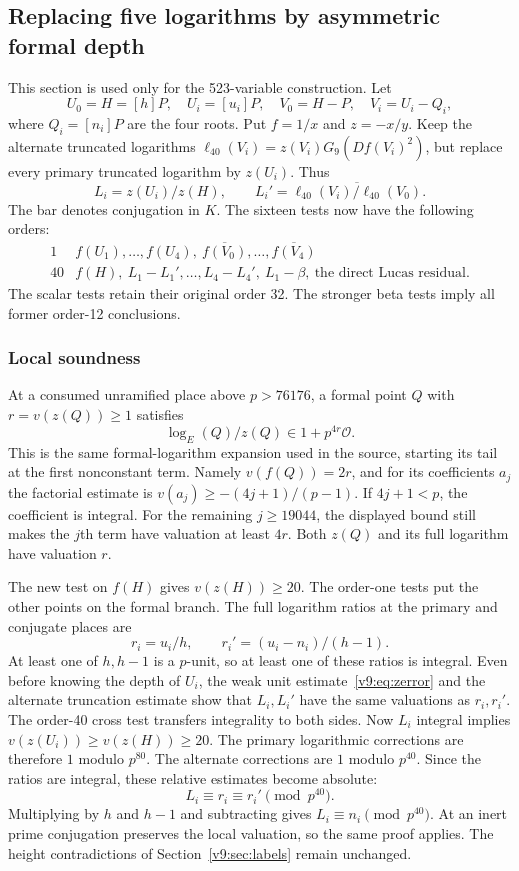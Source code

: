 \subsection{Replacing five logarithms by asymmetric formal depth}\label{v9:sec:depth}
This section is used only for the 523-variable construction. Let
\[
 U_0=H=[h]P,\quad U_i=[u_i]P,\quad
 V_0=H-P,\quad V_i=U_i-Q_i,
\]
where $Q_i=[n_i]P$ are the four roots. Put $f=1/x$ and $z=-x/y$. Keep the alternate truncated logarithms $\ell_{40}(V_i)=z(V_i)G_9(Df(V_i)^2)$, but replace every primary truncated logarithm by $z(U_i)$. Thus
\[
 L_i=z(U_i)/z(H),\qquad
 L_i'=\overline{\ell_{40}(V_i)/\ell_{40}(V_0)}.
\]
The bar denotes conjugation in $K$. The sixteen tests now have the following orders:
\[
\begin{array}{c|l}
1 & f(U_1),\ldots,f(U_4),\ \overline{f(V_0)},\ldots,\overline{f(V_4)}\\[2pt]
40 & f(H),\ L_1-L_1',\ldots,L_4-L_4',\ L_1-\beta,\
       \text{the direct Lucas residual}.
\end{array}
\]
The scalar tests retain their original order 32. The stronger beta tests imply all former order-12 conclusions.

\subsubsection{Local soundness}\label{subsec:v9-local-depth}
At a consumed unramified place above $p>76176$, a formal point $Q$ with $r=v(z(Q))\ge1$ satisfies
\begin{equation}\label{v9:eq:zerror}
 \log_E(Q)/z(Q)\in1+p^{4r}\mathcal O.
\end{equation}
This is the same formal-logarithm expansion used in the source, starting its tail at the first nonconstant term. Namely $v(f(Q))=2r$, and for its coefficients $a_j$ the factorial estimate is $v(a_j)\ge-(4j+1)/(p-1)$. If $4j+1<p$, the coefficient is integral. For the remaining $j\ge19044$, the displayed bound still makes the $j$th term have valuation at least $4r$. Both $z(Q)$ and its full logarithm have valuation $r$.

The new test on $f(H)$ gives $v(z(H))\ge20$. The order-one tests put the other points on the formal branch. The full logarithm ratios at the primary and conjugate places are
\[
 r_i=u_i/h,\qquad r_i'=(u_i-n_i)/(h-1).
\]
At least one of $h,h-1$ is a $p$-unit, so at least one of these ratios is integral. Even before knowing the depth of $U_i$, the weak unit estimate~\eqref{v9:eq:zerror} and the alternate truncation estimate show that $L_i,L_i'$ have the same valuations as $r_i,r_i'$. The order-40 cross test transfers integrality to both sides. Now $L_i$ integral implies $v(z(U_i))\ge v(z(H))\ge20$. The primary logarithmic corrections are therefore $1$ modulo $p^{80}$. The alternate corrections are $1$ modulo $p^{40}$. Since the ratios are integral, these relative estimates become absolute:
\[
 L_i\equiv r_i\equiv r_i'\pmod {p^{40}}.
\]
Multiplying by $h$ and $h-1$ and subtracting gives $L_i\equiv n_i\pmod {p^{40}}$. At an inert prime conjugation preserves the local valuation, so the same proof applies. The height contradictions of Section~\ref{v9:sec:labels} remain unchanged.


